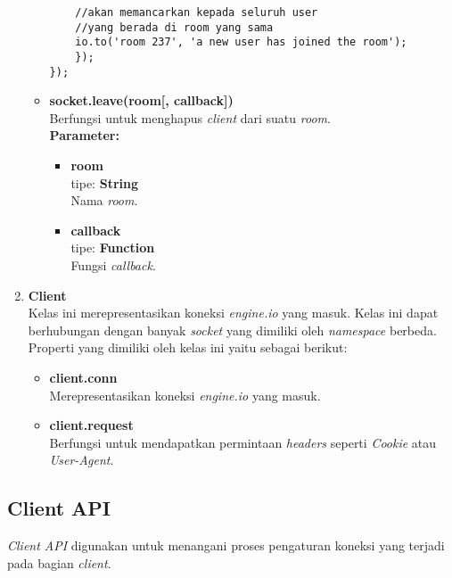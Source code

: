 \begin{enumerate}
\begin{itemize}
\begin{lstlisting}
	//akan memancarkan kepada seluruh user 
	//yang berada di room yang sama
	io.to('room 237', 'a new user has joined the room'); 
	});
});
	\end{lstlisting}
		
		\item \textbf{socket.leave(room[, callback])} \\
		Berfungsi untuk menghapus \textit{client} dari suatu \textit{room}. \\
		\textbf{Parameter:}
		\begin{itemize}
			\item \textbf{room} \\tipe: \textbf{String} \\ Nama \textit{room}.
			\item \textbf{callback} \\tipe: \textbf{Function} \\ Fungsi \textit{callback}.
		\end{itemize}
		
	\end{itemize}
	
	\item \textbf{Client} \\
	Kelas ini merepresentasikan koneksi \textit{engine.io} yang masuk. Kelas ini dapat berhubungan dengan banyak \textit{socket} yang dimiliki oleh \textit{namespace} berbeda. \\
	Properti yang dimiliki oleh kelas ini yaitu sebagai berikut:
	\begin{itemize}
		\item \textbf{client.conn} \\ Merepresentasikan koneksi \textit{engine.io} yang masuk.
		\item \textbf{client.request} \\ Berfungsi untuk mendapatkan permintaan \textit{headers} seperti \textit{Cookie} atau \textit{User-Agent}.
	\end{itemize}
	
\end{enumerate}

\subsection{Client API}
\textit{Client API} digunakan untuk menangani proses pengaturan koneksi yang terjadi pada bagian \textit{client}. 

